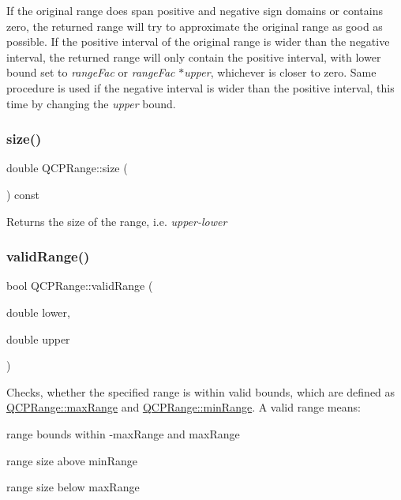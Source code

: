 If the original range does span positive and negative sign domains or contains zero, the returned range will try to approximate the original range as good as possible. If the positive interval of the original range is wider than the negative interval, the returned range will only contain the positive interval, with lower bound set to {\itshape range\+Fac} or {\itshape range\+Fac} $\ast${\itshape upper}, whichever is closer to zero. Same procedure is used if the negative interval is wider than the positive interval, this time by changing the {\itshape upper} bound. \mbox{\label{class_q_c_p_range_a62326e7cc4316b96df6a60813230e63f}} 
\subsubsection{\texorpdfstring{size()}{size()}}
{\footnotesize\ttfamily double Q\+C\+P\+Range\+::size (\begin{DoxyParamCaption}{ }\end{DoxyParamCaption}) const\hspace{0.3cm}{\ttfamily [inline]}}

Returns the size of the range, i.\+e. {\itshape upper-\/{\itshape lower} } \mbox{\label{class_q_c_p_range_ab38bd4841c77c7bb86c9eea0f142dcc0}} 
\subsubsection{\texorpdfstring{valid\+Range()}{validRange()}\hspace{0.1cm}{\footnotesize\ttfamily [1/2]}}
{\footnotesize\ttfamily bool Q\+C\+P\+Range\+::valid\+Range (\begin{DoxyParamCaption}\item[{double}]{lower,  }\item[{double}]{upper }\end{DoxyParamCaption})\hspace{0.3cm}{\ttfamily [static]}}

Checks, whether the specified range is within valid bounds, which are defined as \hyperlink{class_q_c_p_range_a5ca51e7a2dc5dc0d49527ab171fe1f4f}{Q\+C\+P\+Range\+::max\+Range} and \hyperlink{class_q_c_p_range_ab46d3bc95030ee25efda41b89e2b616b}{Q\+C\+P\+Range\+::min\+Range}. A valid range means\+: \begin{DoxyItemize}
\item range bounds within -\/max\+Range and max\+Range \item range size above min\+Range \item range size below max\+Range \end{DoxyItemize}
\mbox{\label{class_q_c_p_range_a801b964752eaad6219be9d8a651ec2b3}} 
